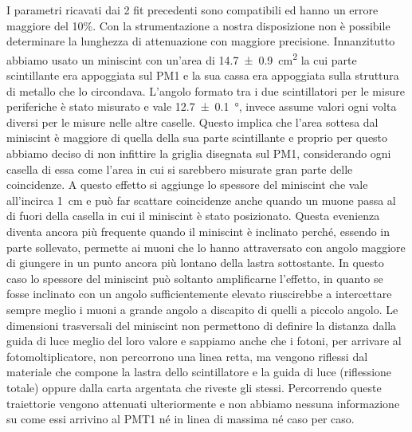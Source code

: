 I parametri ricavati dai 2 fit precedenti sono compatibili ed hanno un errore maggiore del 10\%. Con la strumentazione a nostra disposizione non è possibile determinare la lunghezza di attenuazione con maggiore precisione. Innanzitutto abbiamo usato un miniscint con un'area di \SI{14.7\pm0.9}{cm^2} la cui parte scintillante era appoggiata sul PM1 e la sua cassa  era appoggiata sulla struttura di metallo che lo circondava. L'angolo formato tra i due scintillatori per le misure periferiche è stato misurato e vale \SI{12.7\pm0.1}{\degree}, invece assume valori ogni volta diversi per le misure nelle altre caselle. Questo implica che l'area sottesa dal miniscint è maggiore di quella della sua parte scintillante e proprio per questo abbiamo deciso di non infittire la griglia disegnata sul PM1, considerando ogni casella di essa come l'area in cui si sarebbero misurate gran parte delle coincidenze. A questo effetto si aggiunge lo spessore del miniscint che vale all'incirca \SI{1}{cm} e può far scattare coincidenze anche quando un muone passa al di fuori della casella in cui il miniscint è stato posizionato. Questa evenienza diventa ancora più frequente quando il miniscint è inclinato perché, essendo in parte sollevato, permette ai muoni che lo hanno attraversato con angolo maggiore di giungere in un punto ancora più lontano della lastra sottostante. In questo caso lo spessore del miniscint può soltanto amplificarne l'effetto, in quanto se fosse inclinato con un angolo sufficientemente elevato riuscirebbe a intercettare sempre meglio  i muoni a grande angolo a discapito di quelli a piccolo angolo.
Le dimensioni trasversali del miniscint non permettono di definire la distanza dalla guida di luce meglio del loro valore e sappiamo anche che i fotoni, per arrivare al fotomoltiplicatore,  non percorrono una linea retta, ma vengono riflessi dal materiale che compone la lastra dello scintillatore e la guida di luce (riflessione totale) oppure dalla carta argentata che riveste gli stessi. Percorrendo queste traiettorie vengono attenuati ulteriormente e non abbiamo nessuna informazione su come essi arrivino al PMT1 né in linea di massima né caso per caso.
